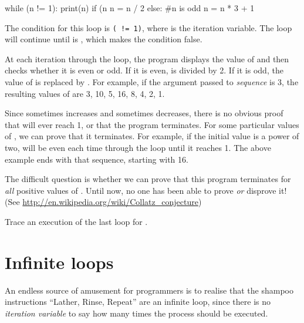 \begin{python}[frame=single]
while (n != 1):
    print(n)
    if (n %
        n = n / 2
    else:                   #n is odd
        n = n * 3 + 1
\end{python}
%
The condition for this loop is \texttt{( != 1)}, where  is the iteration variable. The loop will continue until  is , which makes the condition false.

At each iteration through the loop, the program displays the value of  and then checks whether it is even or odd. If it is even,  is divided by 2. If it is odd, the value of  is replaced by . For example, if the argument passed to \emph{sequence} is 3, the resulting values ​​of  are 3, 10, 5, 16, 8, 4, 2, 1.

Since  sometimes increases and sometimes decreases, there is no obvious proof that  will ever reach 1, or that the program terminates. For some particular values ​​of , we can prove that it terminates. For example, if the initial value is a power of two,  will be even each time through the loop until it reaches 1. The above example ends with that sequence, starting with 16.

The difficult question is whether we can prove that this program terminates for {\em all} positive values of . Until now, no one has been able to prove {\em or} disprove it! (See \url{http://en.wikipedia.org/wiki/Collatz_conjecture})


\begin{exercise}
Trace an execution of the last loop for .
\end{exercise}



\hypertarget{bucles-infinitos}{%
\section{Infinite loops}\label{bucles-infinitos}}

An endless source of amusement for programmers is to realise that the shampoo instructions ``Lather, Rinse, Repeat'' are an infinite loop, since there is no \emph{iteration variable} to say how many times the process should be executed.

